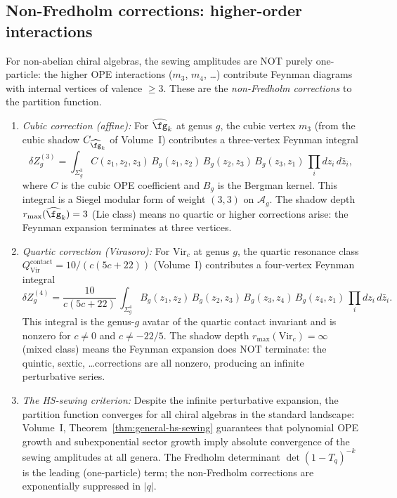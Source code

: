 \subsection{Non-Fredholm corrections: higher-order interactions}

\begin{remark}
For non-abelian chiral algebras, the sewing amplitudes are NOT
purely one-particle: the higher OPE interactions ($m_3$, $m_4$,
\ldots) contribute Feynman diagrams with internal vertices of
valence $\ge 3$. These are the \emph{non-Fredholm corrections}
to the partition function.

\begin{enumerate}[label=\textup{(\roman*)}]
\item \emph{Cubic correction (affine):}
For $\widehat{\fg}_k$ at genus $g$, the cubic vertex $m_3$
(from the cubic shadow $C_{\widehat{\fg}_k}$ of Volume~I)
contributes a three-vertex Feynman integral
\[
\delta Z_g^{(3)}
= \int_{\Sigma_g^3}
C(z_1, z_2, z_3)\,
B_g(z_1, z_2)\, B_g(z_2, z_3)\, B_g(z_3, z_1)\,
\prod_i dz_i\, d\bar{z}_i,
\]
where $C$ is the cubic OPE coefficient and $B_g$ is the
Bergman kernel. This integral is a Siegel modular form
of weight $(3, 3)$ on $\mathcal{A}_g$. The shadow depth
$r_{\max}(\widehat{\fg}_k) = 3$ (Lie class) means no
quartic or higher corrections arise: the Feynman expansion
terminates at three vertices.

\item \emph{Quartic correction (Virasoro):}
For $\mathrm{Vir}_c$ at genus $g$, the quartic resonance
class $Q^{\mathrm{contact}}_{\mathrm{Vir}} = 10/(c(5c+22))$
(Volume~I) contributes a four-vertex Feynman integral
\[
\delta Z_g^{(4)}
= \frac{10}{c(5c+22)}\,
\int_{\Sigma_g^4}
B_g(z_1, z_2)\, B_g(z_2, z_3)\, B_g(z_3, z_4)\,
B_g(z_4, z_1)\,
\prod_i dz_i\, d\bar{z}_i.
\]
This integral is the genus-$g$ avatar of the quartic contact
invariant and is nonzero for $c \ne 0$ and $c \ne -22/5$.
The shadow depth $r_{\max}(\mathrm{Vir}_c) = \infty$ (mixed
class) means the Feynman expansion does NOT terminate: the
quintic, sextic, \ldots corrections are all nonzero, producing
an infinite perturbative series.

\item \emph{The HS-sewing criterion:}
Despite the infinite perturbative expansion, the partition
function converges for all chiral algebras in the standard
landscape: Volume~I, Theorem~\ref*{thm:general-hs-sewing}
guarantees that polynomial OPE growth and subexponential
sector growth imply absolute convergence of the sewing
amplitudes at all genera. The Fredholm determinant $\det(1-T_q)^{-k}$
is the leading (one-particle) term; the non-Fredholm corrections
are exponentially suppressed in $|q|$.
\end{enumerate}
\end{remark}

